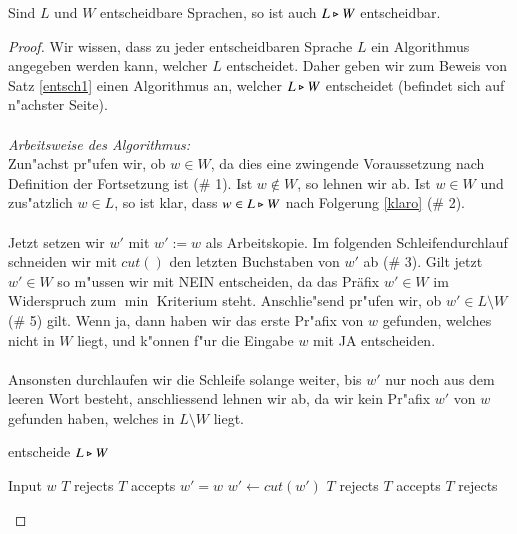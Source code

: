 \begin{satz}\label{entsch1}
Sind $L$ und $W$ entscheidbare Sprachen, so ist auch $L\triangleright W$ entscheidbar.
\end{satz}
\begin{proof}
Wir wissen, dass zu jeder entscheidbaren Sprache $L$ ein Algorithmus angegeben werden kann, welcher $L$ entscheidet. Daher geben wir zum Beweis von Satz \ref{entsch1} einen Algorithmus an, welcher $L\triangleright W$ entscheidet (befindet sich auf n"achster Seite).\\\\
\emph{Arbeitsweise des Algorithmus:}\\
Zun"achst pr"ufen wir, ob $w\in W$, da dies eine zwingende Voraussetzung nach Definition der Fortsetzung ist (\# 1).
Ist $w\notin W$, so lehnen wir ab. Ist $w\in W$ und zus"atzlich $w\in L$, so ist klar, dass $w\in L\triangleright W$ nach Folgerung \ref{klaro} (\# 2).\\\\
Jetzt setzen wir $w'$ mit $w':=w$ als Arbeitskopie. Im folgenden Schleifendurchlauf schneiden wir mit $cut()$ den letzten Buchstaben von $w'$ ab (\# 3). 
Gilt jetzt $w'\in W$ so m"ussen wir mit NEIN entscheiden, da das Präfix $w'\in W$ im Widerspruch zum $\min$ Kriterium steht.
Anschlie"send pr"ufen wir, ob $w'\in L\setminus W$ (\# 5) gilt. Wenn ja, dann haben wir das erste Pr"afix von $w$ gefunden, welches nicht in $W$ liegt, und k"onnen f"ur die Eingabe $w$ mit JA entscheiden.
\\\\Ansonsten durchlaufen wir die Schleife solange weiter, bis $w'$ nur noch aus dem leeren Wort besteht, anschliessend lehnen wir ab, da wir kein Pr"afix $w'$ von $w$ gefunden haben, welches in $L\setminus W$ liegt.
\begin{algorithm}
\caption{entscheide $L\triangleright W$}
\label{split}
\begin{algorithmic}
\STATE Input $w$
\STATE $T$ rejects 
\ELSE
{}
\STATE $T$ accepts  
\ENDIF
\ENDIF
\STATE $w' = w$  
\REPEAT
\STATE $w' \leftarrow \mathit{cut}(w')$ 
\STATE $T$ rejects
\ENDIF
{}
\STATE $T$ accepts
\ENDIF
{}
\STATE $T$ rejects
\end{algorithmic}
\end{algorithm}

\end{proof}



